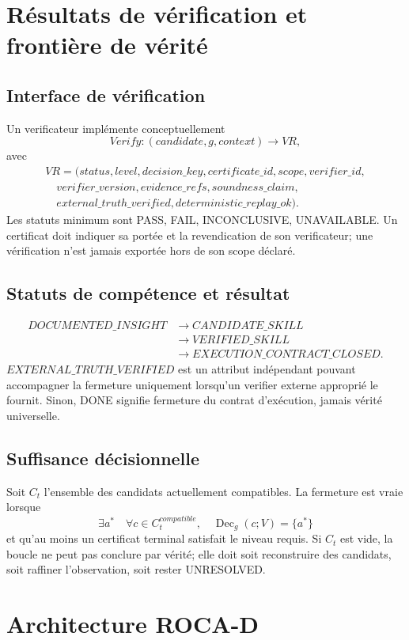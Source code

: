 \documentclass[11pt,a4paper]{report}
\newcommand{\Dec}{\operatorname{Dec}}
\begin{document}
\chapter{Résultats de vérification et frontière de vérité}
\section{Interface de vérification}
Un verificateur implémente conceptuellement
\[
Verify:(candidate,g,context)\to VR,
\]
avec
\[
\begin{aligned}
VR=(status,level,decision\_key,certificate\_id,scope,verifier\_id,\\
\quad verifier\_version,evidence\_refs,soundness\_claim,\\
\quad external\_truth\_verified,deterministic\_replay\_ok).
\end{aligned}
\]
Les statuts minimum sont PASS, FAIL, INCONCLUSIVE, UNAVAILABLE. Un certificat doit indiquer sa portée et la revendication de son verificateur; une vérification n'est jamais exportée hors de son scope déclaré.

\section{Statuts de compétence et résultat}
\[
\begin{aligned}
DOCUMENTED\_INSIGHT &\to CANDIDATE\_SKILL \\
&\to VERIFIED\_SKILL \\ 
&\to EXECUTION\_CONTRACT\_CLOSED.
\end{aligned}
\]
$EXTERNAL\_TRUTH\_VERIFIED$ est un attribut indépendant pouvant accompagner la fermeture uniquement lorsqu'un verifier externe approprié le fournit. Sinon, DONE signifie fermeture du contrat d'exécution, jamais vérité universelle.

\section{Suffisance décisionnelle}
Soit $C_t$ l'ensemble des candidats actuellement compatibles. La fermeture est vraie lorsque
\[
\exists a^*\quad\forall c\in C_t^{compatible},\quad
\Dec_g(c;V)=\{a^*\}
\]
et qu'au moins un certificat terminal satisfait le niveau requis. Si $C_t$ est vide, la boucle ne peut pas conclure par vérité; elle doit soit reconstruire des candidats, soit raffiner l'observation, soit rester UNRESOLVED.

\chapter{Architecture ROCA-D}
\end{document}
